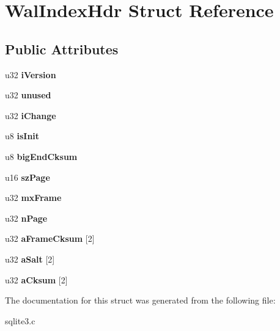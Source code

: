\hypertarget{structWalIndexHdr}{}\section{Wal\+Index\+Hdr Struct Reference}
\label{structWalIndexHdr}
\subsection*{Public Attributes}
\begin{DoxyCompactItemize}
\item 
u32 {\bfseries i\+Version}\hypertarget{structWalIndexHdr_a49295f5eb9d6f37a1498cf1a66410b92}{}\label{structWalIndexHdr_a49295f5eb9d6f37a1498cf1a66410b92}

\item 
u32 {\bfseries unused}\hypertarget{structWalIndexHdr_aa00596b4ad38dce7f97261a49ce64d74}{}\label{structWalIndexHdr_aa00596b4ad38dce7f97261a49ce64d74}

\item 
u32 {\bfseries i\+Change}\hypertarget{structWalIndexHdr_a9fafc4d4af9ab741b3b8733380a7927f}{}\label{structWalIndexHdr_a9fafc4d4af9ab741b3b8733380a7927f}

\item 
u8 {\bfseries is\+Init}\hypertarget{structWalIndexHdr_a1cc0dc2be6cd108a7bcca260be3e4cb9}{}\label{structWalIndexHdr_a1cc0dc2be6cd108a7bcca260be3e4cb9}

\item 
u8 {\bfseries big\+End\+Cksum}\hypertarget{structWalIndexHdr_aa6be53a6a60ea0b2a97a245b5ca68d61}{}\label{structWalIndexHdr_aa6be53a6a60ea0b2a97a245b5ca68d61}

\item 
u16 {\bfseries sz\+Page}\hypertarget{structWalIndexHdr_a74e9182803402942cf6e45d8e23589c7}{}\label{structWalIndexHdr_a74e9182803402942cf6e45d8e23589c7}

\item 
u32 {\bfseries mx\+Frame}\hypertarget{structWalIndexHdr_aa697dbe8134daf3d02dce07feb897f41}{}\label{structWalIndexHdr_aa697dbe8134daf3d02dce07feb897f41}

\item 
u32 {\bfseries n\+Page}\hypertarget{structWalIndexHdr_ae4ca33947cd629feb9dce2b1f976c364}{}\label{structWalIndexHdr_ae4ca33947cd629feb9dce2b1f976c364}

\item 
u32 {\bfseries a\+Frame\+Cksum} \mbox{[}2\mbox{]}\hypertarget{structWalIndexHdr_a425dff294e0f0b30b6819c273404c721}{}\label{structWalIndexHdr_a425dff294e0f0b30b6819c273404c721}

\item 
u32 {\bfseries a\+Salt} \mbox{[}2\mbox{]}\hypertarget{structWalIndexHdr_af99b92f673fd7ba1e4e4f9feb955453f}{}\label{structWalIndexHdr_af99b92f673fd7ba1e4e4f9feb955453f}

\item 
u32 {\bfseries a\+Cksum} \mbox{[}2\mbox{]}\hypertarget{structWalIndexHdr_aa202339b02766d088717bfce9e3a9c0e}{}\label{structWalIndexHdr_aa202339b02766d088717bfce9e3a9c0e}

\end{DoxyCompactItemize}


The documentation for this struct was generated from the following file\+:\begin{DoxyCompactItemize}
\item 
sqlite3.\+c\end{DoxyCompactItemize}
